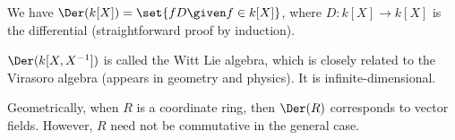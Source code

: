 We have $\Der(k[X]) = \set{fD\given f \in k[X]}$,
where $D\colon k[X]\to k[X]$ is the differential
(straightforward proof by induction).

$\Der(k[X, X^{-1}])$ is called the Witt Lie algebra, which is closely related
to the Virasoro algebra (appears in geometry and physics). It is
infinite-dimensional.

Geometrically, when $R$ is a coordinate ring, then $\Der(R)$ corresponds to vector
fields. However, $R$ need not be commutative in the general case.
